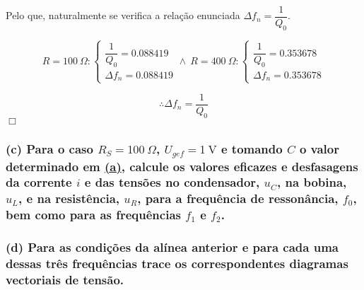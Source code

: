 Pelo que, naturalmente se verifica a relação enunciada $\Delta f_n = \dfrac{1}{Q_0}$.

$$
R=100\ \Omega:
\begin{cases}
    \dfrac{1}{Q_0} = 0.088419\\
    \Delta f_n = 0.088419
\end{cases}
\land\
R=400\ \Omega:
\begin{cases}
    \dfrac{1}{Q_0} = 0.353678\\
    \Delta f_n = 0.353678
\end{cases}
$$

$$\therefore \Delta f_n = \frac{1}{Q_0}$$
\hfill \ensuremath{\Box}
\subsubsection*{(c) Para o caso $R_S = 100\ \Omega$, $U_{gef} = 1\ \text{V}$ e tomando $C$ o valor determinado em \hyperref[subsubsec_a]{(a)}, calcule os valores eficazes e desfasagens da corrente $i$ e das tensões no condensador, $u_C$, na bobina, $u_L$, e na resistência, $u_R$, para a frequência de ressonância, $f_0$, bem como para as frequências $f_1$ e $f_2$.}
\subsubsection*{(d) Para as condições da alínea anterior e para cada uma dessas três frequências trace os correspondentes diagramas vectoriais de tensão.}
